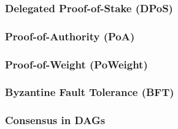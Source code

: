 \subsubsection{Delegated Proof-of-Stake (DPoS)}
\subsubsection{Proof-of-Authority (PoA)}
\subsubsection{Proof-of-Weight (PoWeight)}
\subsubsection{Byzantine Fault Tolerance (BFT)}
\subsubsection{Consensus in DAGs}
